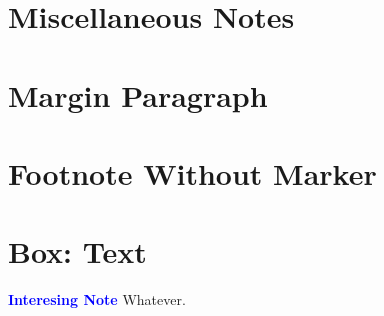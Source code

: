 \section{Miscellaneous Notes}



\section{Margin Paragraph} 

\section{Footnote Without Marker} 

\section{Box: Text}
\begin{tcolorbox}[colback=blue!5!white,colframe=blue!75!black]
	\textcolor{blue}{\textbf{Interesing Note}}
	\tcblower
	Whatever.
\end{tcolorbox}

